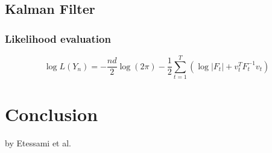 \documentclass[11pt, oneside]{scrreprt}   	%
\begin{document}
\section{Kalman Filter}

\subsection{Likelihood evaluation}
$$
\log L(Y_n) = -\frac{nd}{2} \log(2 \pi) - \frac{1}{2} \sum_{t=1}^T (\log |F_t| + v_t^TF_t^{-1} v_t)
$$



\chapter{Conclusion}
\label{chp:conclusion}
by Etessami et al.\cite{etessami2014_2}



\end{document}

